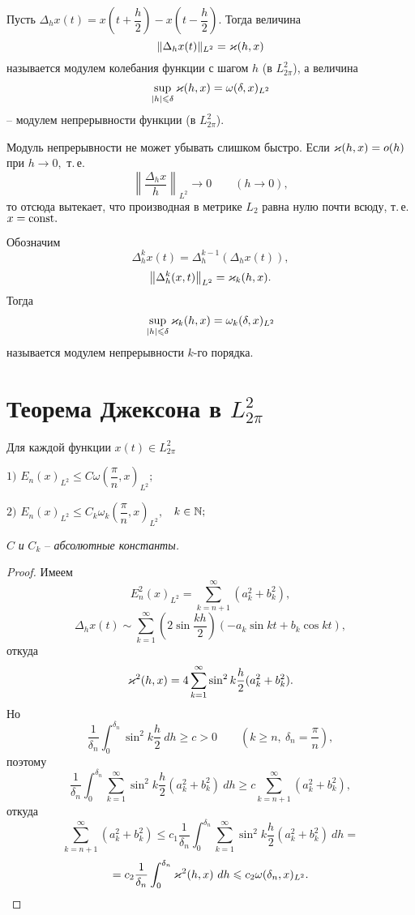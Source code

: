 Пусть $\Delta_h x(t)=x\left( t+\dfrac{h}{2}\right)-x\left( t-\dfrac{h}{2}\right).$ Тогда величина
$$
\|\Delta_h x(t)\|_{{L^2}}=\varkappa(h,x)
$$
называется модулем колебания функции с шагом $h$ (в $L^2_{2\pi}$), а
величина
$$
\sup_{|h|\leqslant \delta} \varkappa(h,x)=\omega(\delta,x)_{{L^2}}
$$
-- модулем непрерывности функции (в $L^2_{2\pi}$).

\begin{Remark} %
Модуль непрерывности не может убывать
слишком быстро. Если $\varkappa(h,x)=o(h)$ при $h\to 0,$ т.\,е.
$$
\left\| \frac{\Delta_h x}{h}\right\|_{{L^2}} \to 0\qquad (h\to 0),
$$
то отсюда вытекает, что производная в метрике $L_2$
равна нулю почти всюду, т.\,е. \linebreak $x=\rm const.$
\end{Remark}

Обозначим
$$
{\Delta_h^k x(t)=\Delta_h^{k-1}(\Delta_h x(t)),}
$$
$$
\left\| \Delta_h^k(x,t)\right\|_{{L^2}}=\varkappa_k(h,x).
$$
Тогда
$$
\sup_{|h|\leqslant \delta} \varkappa_k(h,x)=\omega_k(\delta,x)_{{L^2}}
$$
называется модулем непрерывности $k$-го порядка.

\section{Теорема Джексона в {$L^2_{2\pi}$}}

\begin{teo}
Для каждой функции $x(t)\in L^2_{2\pi}$

$1)$ $E_n(x)_{{L^2}}\le C\omega\left( \dfrac{\pi}{n},x\right)_{{L^2}};$

$2)$ $E_n(x)_{{L^2}}\le C_k \omega_k \left( \dfrac{\pi}{n},x\right)_{{L^2}},$~ $k\in \mathbb{N};$

 $C$ {\it и} $C_k$ -- {\it абсолютные константы.}
\end{teo}

\begin{proof}%
Имеем
$$
E_n^2(x)_{L^2}=\sum\limits_{k=n+1}^{\infty}(a_k^2+b_k^2),
$$
$$
{\Delta_h x(t)\sim\sum\limits_{k=1}^\infty\left(2\sin \frac{kh}{2}\right)(-a_k\sin kt+ b_k\cos kt),}
$$
{откуда}
$$
\varkappa^2(h,x)=4 \sum\limits_{k=1}^{\infty}\sin^2 k\frac{h}{2} (a_k^2+b_k^2).
$$
Но
$$
\frac{1}{\delta_n}\int_0^{\delta_n} \sin^2 k\frac{h}{2}\ {dh} \ge c>0\qquad
\left( k\ge n,\ \delta_n=\frac{\pi}{n}\right),
$$
поэтому
$$
\frac{1}{\delta_n}\int_0^{\delta_n} \sum\limits_{k=1}^{\infty}
\sin^2 k\frac{h}{2}(a_k^2+b_k^2)\ dh \ge
c \sum\limits_{k=n+1}^{\infty} (a_k^2+b_k^2),
$$
откуда
$$
\sum\limits_{k=n+1}^{\infty} (a_k^2+b_k^2)\le c_1 \frac{1}{\delta_n}
\int_0^{\delta_n} \sum\limits_{k=1}^{\infty}
\sin^2 k\frac{h}{2}(a_k^2+b_k^2)\ dh=
$$
$$
=c_2\frac{1}{\delta_n} \int_0^{\delta_n}\varkappa^2 (h,x)\ dh \leqslant
c_2\omega(\delta_n,x)_{{L^2}}.
$$
\end{proof}

